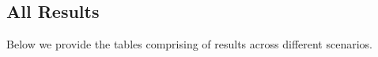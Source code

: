 \subsection{All Results}
Below we provide the tables comprising of results across different \livecodebench{} scenarios.



